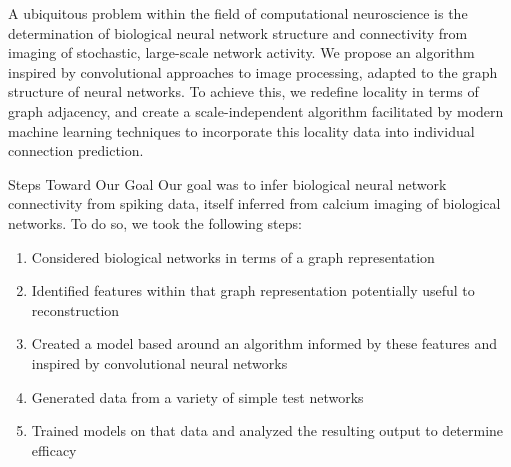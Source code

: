 \documentclass[12pt]{article}
\begin{document}
\begin{posterbard}


	\begin{posterboxabstract}
		\noindent A ubiquitous problem within the field of computational 
neuroscience is the determination of biological neural network structure and 
connectivity from imaging of stochastic, large-scale network activity. We 
propose an algorithm inspired by convolutional approaches to image processing, 
adapted to the graph structure of neural networks. To achieve this, we redefine 
locality in terms of graph adjacency, and create a scale-independent algorithm 
facilitated by modern machine learning techniques to incorporate this locality 
data into individual connection prediction.
	\end{posterboxabstract}

	\begin{posterboxtitle}{Steps Toward Our Goal}
		\noindent Our goal was to infer biological neural network connectivity 
		from spiking data, itself inferred from calcium imaging of biological 
		networks. To do so, we took the following steps:
		\begin{enumerate}
			\item Considered biological networks in terms of a graph 
				representation
			\item Identified features within that graph representation 
				potentially useful to reconstruction
			\item Created a model based around an algorithm informed by these 
				features and inspired by convolutional neural networks
			\item Generated data from a variety of simple test networks
			\item Trained models on that data and analyzed the resulting output 
				to determine efficacy
		\end{enumerate}
	\end{posterboxtitle}


\end{posterbard}
\end{document}
